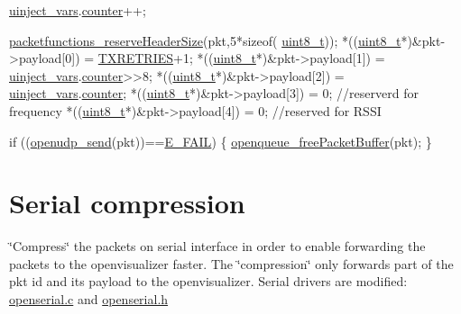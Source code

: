 \begin{DoxyCodeInclude}
   \hyperlink{uinject_8c_a24b960a84347986d2bc83683d2793bf0}{uinject\_vars}.\hyperlink{structuinject__vars__t_a97940d6759ea18706492ae05ad24730f}{counter}++;
   
   \hyperlink{group___packet_functions_ga690ad87588077409f382584732259925}{packetfunctions\_reserveHeaderSize}(pkt,5*\textcolor{keyword}{sizeof}(
      \hyperlink{_p_e___types_8h_aba7bc1797add20fe3efdf37ced1182c5}{uint8\_t}));
   *((\hyperlink{_p_e___types_8h_aba7bc1797add20fe3efdf37ced1182c5}{uint8\_t}*)&pkt->payload[0]) = \hyperlink{group___i_e_e_e802154_e_ga2ad5d0a4cdd37feb8c5e52db2978062f}{TXRETRIES}+1;
   *((\hyperlink{_p_e___types_8h_aba7bc1797add20fe3efdf37ced1182c5}{uint8\_t}*)&pkt->payload[1]) = \hyperlink{uinject_8c_a24b960a84347986d2bc83683d2793bf0}{uinject\_vars}.\hyperlink{structuinject__vars__t_a97940d6759ea18706492ae05ad24730f}{counter}>>8;
   *((\hyperlink{_p_e___types_8h_aba7bc1797add20fe3efdf37ced1182c5}{uint8\_t}*)&pkt->payload[2]) = \hyperlink{uinject_8c_a24b960a84347986d2bc83683d2793bf0}{uinject\_vars}.\hyperlink{structuinject__vars__t_a97940d6759ea18706492ae05ad24730f}{counter};
   *((\hyperlink{_p_e___types_8h_aba7bc1797add20fe3efdf37ced1182c5}{uint8\_t}*)&pkt->payload[3]) = 0; \textcolor{comment}{//reserverd for frequency}
   *((\hyperlink{_p_e___types_8h_aba7bc1797add20fe3efdf37ced1182c5}{uint8\_t}*)&pkt->payload[4]) = 0; \textcolor{comment}{//reserved for RSSI}

   \textcolor{keywordflow}{if} ((\hyperlink{group___open_udp_ga9e3ddc36106b92231cf7cfb3b5cabbd4}{openudp\_send}(pkt))==\hyperlink{opendefs_8h_a85c7862086c1f92e4fb4108e176d8140afd5484f4c22c4ddd79b539facd9ad7eb}{E\_FAIL}) \{
      \hyperlink{group___open_queue_ga326f90b6a0c7a331257b524a5af236d4}{openqueue\_freePacketBuffer}(pkt);
   \}
\end{DoxyCodeInclude}
 

 \hypertarget{_l_k_n_contribution_Serial_compression}{}\section{Serial compression}\label{_l_k_n_contribution_Serial_compression}
\char`\"{}\+Compress\char`\"{} the packets on serial interface in order to enable forwarding the packets to the openvisualizer faster. The \char`\"{}compression\char`\"{} only forwards part of the pkt id and its payload to the openvisualizer. Serial drivers are modified\+: \hyperlink{openserial_8c}{openserial.\+c} and \hyperlink{openserial_8h}{openserial.\+h}


